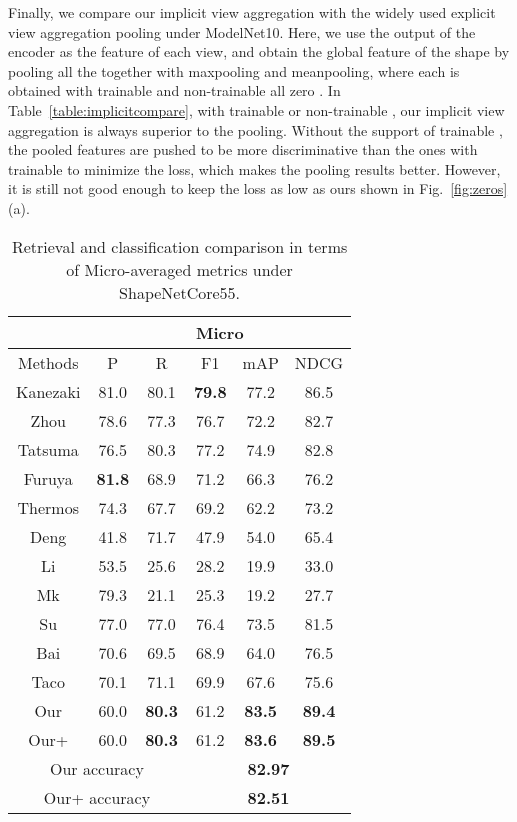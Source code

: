\documentclass[letterpaper]{article} \usepackage{aaai19}  \usepackage{times}  \usepackage{helvet}  \usepackage{courier}  \usepackage{url}  \usepackage{graphicx}
\begin{document}
Finally, we compare our implicit view aggregation with the widely used explicit view aggregation pooling under ModelNet10. Here, we use the output  of the encoder  as the feature of each view, and obtain the global feature of the shape by pooling all the  together with maxpooling and meanpooling, where each  is obtained with trainable  and non-trainable all zero . In Table~\ref{table:implicitcompare}, with trainable or non-trainable , our implicit view aggregation is always superior to the pooling. Without the support of trainable , the pooled features are pushed to be more discriminative than the ones with trainable  to minimize the loss, which makes the pooling results better. However, it is still not good enough to keep the loss as low as ours shown in Fig.~\ref{fig:zeros}(a).

\begin{table}[htb]
\centering
\caption{Retrieval and classification comparison in terms of Micro-averaged metrics under ShapeNetCore55.}  \begin{tabular}{c|c|c|c|c|c}  \hline
        & \multicolumn{5}{|c}{Micro} \\
     \hline
       Methods & P & R & F1 & mAP & NDCG  \\  \hline
Kanezaki & 81.0 & 80.1 & \textbf{79.8} & 77.2 & 86.5 \\
       Zhou & 78.6 & 77.3 & 76.7 & 72.2 & 82.7 \\
       Tatsuma  & 76.5 & 80.3 & 77.2 & 74.9 & 82.8  \\
       Furuya  & \textbf{81.8} & 68.9 & 71.2 & 66.3 & 76.2  \\
       Thermos  & 74.3 & 67.7 & 69.2 & 62.2 & 73.2 \\
       Deng  & 41.8 & 71.7 & 47.9 & 54.0 & 65.4 \\
       Li  & 53.5 & 25.6 & 28.2 & 19.9 & 33.0 \\
       Mk  & 79.3 & 21.1 & 25.3 & 19.2 & 27.7 \\
       Su  & 77.0 & 77.0 & 76.4 & 73.5 & 81.5 \\
       Bai  & 70.6 & 69.5 & 68.9 & 64.0 & 76.5 \\
       Taco  & 70.1 & 71.1 & 69.9 & 67.6 & 75.6 \\
       Our  & 60.0 & \textbf{80.3} & 61.2 & \textbf{83.5} & \textbf{89.4} \\Our+  & 60.0 & \textbf{80.3} & 61.2 & \textbf{83.6} & \textbf{89.5} \\\hline
       \multicolumn{3}{c|}{Our accuracy} & \multicolumn{3}{|c}{\textbf{82.97}} \\
       \multicolumn{3}{c|}{Our+ accuracy} & \multicolumn{3}{|c}{\textbf{82.51}} \\
     \hline
   \end{tabular}
   \label{table:t10}
\end{table}
\end{document}
